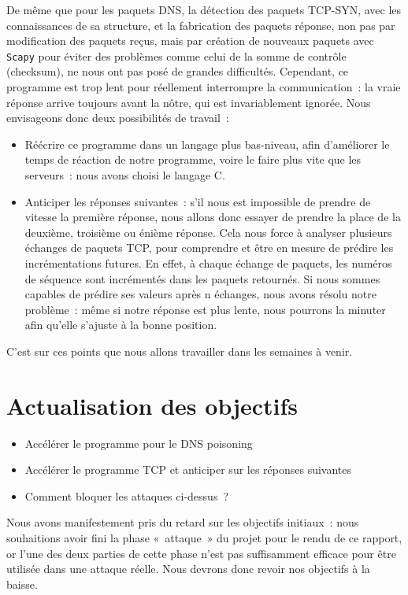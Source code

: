 \documentclass[a4paper, 12pt,twoside]{article}
\begin{document}
      De même que pour les paquets DNS, la détection des paquets TCP-SYN, avec les connaissances de sa structure, et la fabrication des paquets réponse, non pas par modification des paquets reçus, mais par création de nouveaux paquets avec \verb!Scapy! pour éviter des problèmes comme celui de la somme de contrôle (checksum), ne nous ont pas posé de grandes difficultés. Cependant, ce programme est trop lent pour réellement interrompre la communication~: la vraie réponse arrive toujours avant la nôtre, qui est invariablement ignorée. Nous envisageons donc deux possibilités de travail~:
  \begin{itemize}[label=\color{bleu303}\textbullet{}]
      \item Réécrire ce programme dans un langage plus bas-niveau, afin d'améliorer le temps de réaction de notre programme, voire le faire plus vite que les serveurs~: nous avons choisi le langage C.
      \item Anticiper les réponses suivantes~: s'il nous est impossible de prendre de vitesse la première réponse, nous allons donc essayer de prendre la place de la deuxième, troisième ou énième réponse. Cela nous force à analyser plusieurs échanges de paquets TCP, pour comprendre et être en mesure de prédire les incrémentations futures. En effet, à chaque échange de paquets, les numéros de séquence sont incrémentés dans les paquets retournés. Si nous sommes capables de prédire ses valeurs après n échanges, nous avons résolu notre problème~: même si notre réponse est plus lente, nous pourrons la minuter afin qu'elle s'ajuste à la bonne position.
  \end{itemize}


  C'est sur ces points que nous allons travailler dans les semaines à venir.
\newpage

\section{Actualisation des objectifs}

    \begin{itemize}[label=\color{bleu303}\textbullet{}]
        \item Accélérer le programme pour le DNS poisoning
        \item Accélérer le programme TCP et anticiper sur les réponses suivantes
        \item Comment bloquer les attaques ci-dessus~?
    \end{itemize}

    Nous avons manifestement pris du retard sur les objectifs initiaux~: nous souhaitions avoir fini la phase «~attaque~» du projet pour le rendu de ce rapport, or l'une des deux parties de cette phase n'est pas suffisamment efficace pour être utilisée dans une attaque réelle. Nous devrons donc revoir nos objectifs à la baisse.
\end{document}
